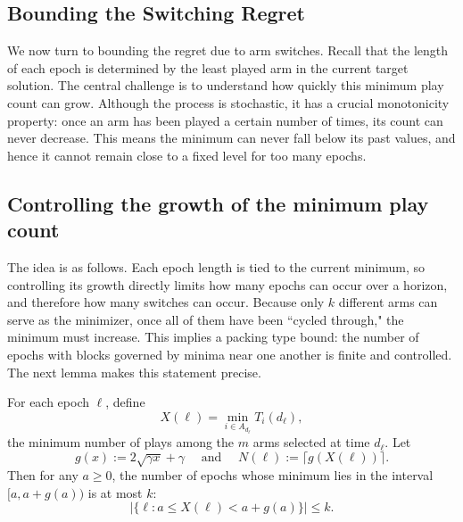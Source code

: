 \documentclass[opre,blindrev]{informs3}
\begin{document}
\begin{APPENDICES}
\section{Bounding the Switching Regret}
We now turn to bounding the regret due to arm switches. Recall that the length of each epoch is determined by the least played arm in the current target solution. The central challenge is to understand how quickly this minimum play count can grow. Although the process is stochastic, it has a crucial monotonicity property: once an arm has been played a certain number of times, its count can never decrease. This means the minimum can never fall below its past values, and hence it cannot remain close to a fixed level for too many epochs.  

\subsection{Controlling the growth of the minimum play count}
The idea is as follows. Each epoch length is tied to the current minimum, so controlling its growth directly limits how many epochs can occur over a horizon, and therefore how many switches can occur. Because only \(k\) different arms can serve as the minimizer, once all of them have been ``cycled through," the minimum must increase. This implies a packing type bound: the number of epochs with blocks governed by minima near one another is finite and controlled. The next lemma makes this statement precise.  


\begin{lemma}\label{lem:local-packing}
    For each epoch \(\ell\), define
    \[
        X(\ell) = \min_{i \in A_{d_\ell}} T_i(d_\ell),
    \]
    the minimum number of plays among the \(m\) arms selected at time \(d_\ell\). Let
    \[
        g(x) := 2\sqrt{\gamma  x} + \gamma 
        \quad \text{ and } \quad 
        N(\ell) := \bigl\lceil g(X(\ell)) \bigr\rceil.
    \]
    Then for any \(a \ge 0\), the number of epochs whose minimum lies in the
    interval \([a,  a + g(a))\) is at most \(k\):
    \[
        \bigl|\{\ell : a  \leq X(\ell) < a + g(a)\}\bigr|  \leq k.
    \]
\end{lemma}


\end{APPENDICES}
\end{document}
